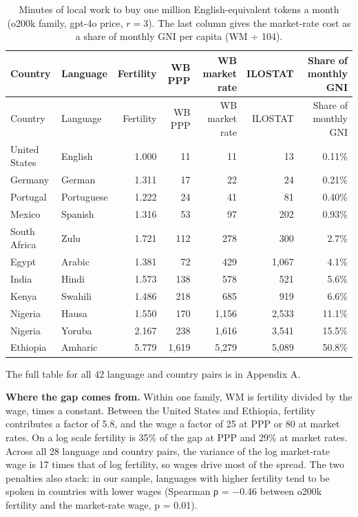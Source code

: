 \documentclass[11pt]{article}
\begin{document}
\begin{longtable}[]{@{}llrrrrr@{}}
\caption{Minutes of local work to buy one million English-equivalent tokens a month (o200k family, gpt-4o price, \(r = 3\)). The last column gives the market-rate cost as a share of monthly GNI per capita (WM ÷ 104).}\tabularnewline
\toprule\noalign{}
Country & Language & Fertility & WB PPP & WB market rate & ILOSTAT & Share of monthly GNI \\
\midrule\noalign{}
\endfirsthead
\toprule\noalign{}
Country & Language & Fertility & WB PPP & WB market rate & ILOSTAT & Share of monthly GNI \\
\midrule\noalign{}
\endhead
\bottomrule\noalign{}
\endlastfoot
United States & English & 1.000 & 11 & 11 & 13 & 0.11\% \\
Germany & German & 1.311 & 17 & 22 & 24 & 0.21\% \\
Portugal & Portuguese & 1.222 & 24 & 41 & 81 & 0.40\% \\
Mexico & Spanish & 1.316 & 53 & 97 & 202 & 0.93\% \\
South Africa & Zulu & 1.721 & 112 & 278 & 300 & 2.7\% \\
Egypt & Arabic & 1.381 & 72 & 429 & 1,067 & 4.1\% \\
India & Hindi & 1.573 & 138 & 578 & 521 & 5.6\% \\
Kenya & Swahili & 1.486 & 218 & 685 & 919 & 6.6\% \\
Nigeria & Hausa & 1.550 & 170 & 1,156 & 2,533 & 11.1\% \\
Nigeria & Yoruba & 2.167 & 238 & 1,616 & 3,541 & 15.5\% \\
Ethiopia & Amharic & 5.779 & 1,619 & 5,279 & 5,089 & 50.8\% \\
\end{longtable}

The full table for all 42 language and country pairs is in Appendix A.

\textbf{Where the gap comes from.} Within one family, WM is fertility divided by the wage, times a constant. Between the United States and Ethiopia, fertility contributes a factor of 5.8, and the wage a factor of 25 at PPP or 80 at market rates. On a log scale fertility is 35\% of the gap at PPP and 29\% at market rates. Across all 28 language and country pairs, the variance of the log market-rate wage is 17 times that of log fertility, so wages drive most of the spread. The two penalties also stack: in our sample, languages with higher fertility tend to be spoken in countries with lower wages (Spearman ρ = −0.46 between o200k fertility and the market-rate wage, p = 0.01).
\end{document}
